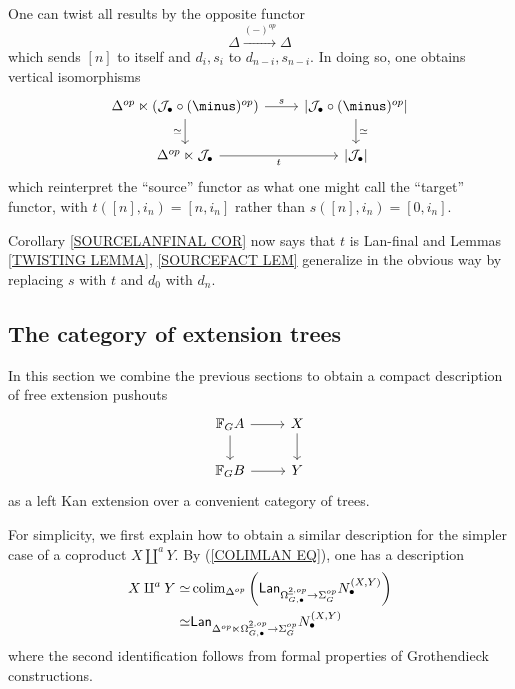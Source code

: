 \documentclass[a4paper,10pt]{article}%
\begin{document}
\begin{remark}\label{DUALRESULTS REM}
	One can twist all results by the opposite functor
	\[\Delta \xrightarrow{(\minus)^{op}} \Delta\]
	which sends $[n]$ to itself and $d_i,s_i$ to $d_{n-i},s_{n-i}$.
	In doing so, one obtains vertical isomorphisms	
\[
\begin{tikzcd}
	\Delta^{op} \ltimes \left(\mathcal{J}_{\bullet} \circ (\minus)^{op} \right) \ar{r}{s} \ar{d}[swap]{\simeq} &
	\left|\mathcal{J}_{\bullet} \circ (\minus)^{op}\right|
	\ar{d}{\simeq}
\\
	\Delta^{op} \ltimes \mathcal{J}_{\bullet} \ar{r}[swap]{t} &
	\left| \mathcal{J}_{\bullet} \right|
\end{tikzcd}
\]
which reinterpret the ``source'' functor as what one might call the ``target'' functor, with $t([n],i_n)= [n,i_n]$ rather than 
$s([n],i_n)= [0,i_n]$.

	Corollary \ref{SOURCELANFINAL COR} now says that $t$ is Lan-final
	and Lemmas \ref{TWISTING LEMMA}, \ref{SOURCEFACT LEM} generalize in the obvious way by replacing $s$ with $t$ and $d_0$ with $d_n$.
\end{remark}



\subsection{The category of extension trees}

In this section we combine the previous sections to obtain a compact description of free extension pushouts
\begin{equation}\label{FREEEXT EQ}
\begin{tikzcd}
	\mathbb{F}_G A \ar{r} \ar{d} & X \ar{d}
\\
	\mathbb{F}_G B \ar{r} & Y
\end{tikzcd}
\end{equation}
as a left Kan extension over a convenient category of trees.

For simplicity, we first explain how to obtain a similar description for the simpler case of a coproduct $X \amalg^a Y$.
By (\ref{COLIMLAN EQ}), one has a description 
\begin{align*}
	X \amalg^a Y \simeq  &
	\operatorname{colim}_{\Delta^{op}}
	\left(
	\mathsf{Lan}_{\Omega_{G,\bullet}^{\underline{2},op} \to \Sigma_G^{op}}
	N_{\bullet}^{(X,Y)}
	\right)
\\
	\simeq &
	\mathsf{Lan}_{\Delta^{op} \ltimes \Omega_{G,\bullet}^{\underline{2},op} \to \Sigma_G^{op}}
	N_{\bullet}^{(X,Y)}
\end{align*}
where the second identification follows from formal properties of Grothendieck constructions.
\end{document}
